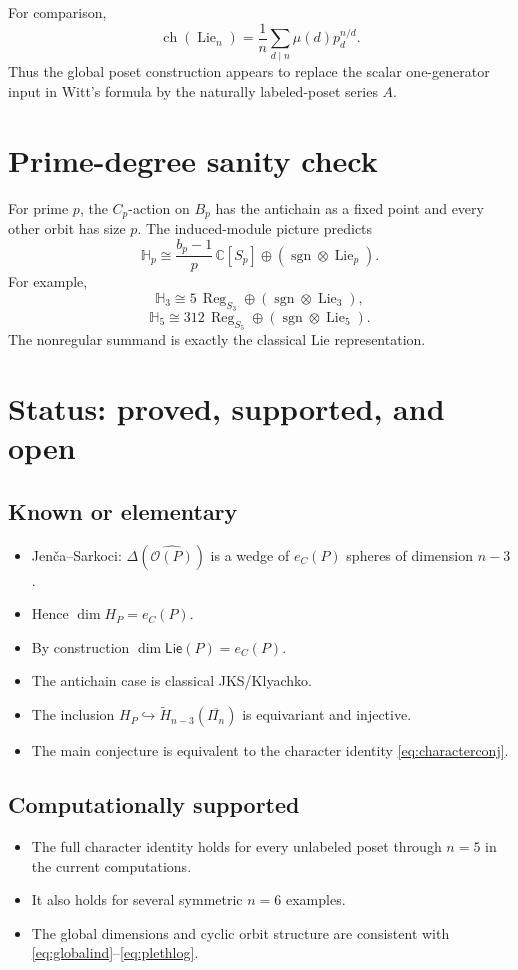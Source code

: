 \documentclass[11pt]{article}
\newcommand{\OP}{\mathcal O}
\newcommand{\Lie}{\operatorname{Lie}}
\newcommand{\sgn}{\operatorname{sgn}}
\newcommand{\ch}{\operatorname{ch}}
\newcommand{\HH}{\mathbb H}
\begin{document}
For comparison,
\[
\ch(\Lie_n)=\frac1n\sum_{d\mid n}\mu(d)p_d^{n/d}.
\]
Thus the global poset construction appears to replace the scalar one-generator
input in Witt's formula by the naturally labeled-poset series $A$.

\section{Prime-degree sanity check}
For prime $p$, the $C_p$-action on $B_p$ has the antichain as a fixed point
and every other orbit has size $p$. The induced-module picture predicts
\[
\HH_p\cong\frac{b_p-1}{p}\,\mathbb C[S_p]\oplus
(\sgn\otimes\Lie_p).
\]
For example,
\[
\HH_3\cong5\,\operatorname{Reg}_{S_3}\oplus
(\sgn\otimes\Lie_3),
\]
\[
\HH_5\cong312\,\operatorname{Reg}_{S_5}\oplus
(\sgn\otimes\Lie_5).
\]
The nonregular summand is exactly the classical Lie representation.

\section{Status: proved, supported, and open}
\subsection*{Known or elementary}
\begin{itemize}
\item Jen\v{c}a--Sarkoci: $\Delta(\widehat{\OP(P)})$ is a wedge of
$e_C(P)$ spheres of dimension $n-3$.
\item Hence $\dim H_P=e_C(P)$.
\item By construction $\dim\mathsf{Lie}(P)=e_C(P)$.
\item The antichain case is classical JKS/Klyachko.
\item The inclusion $H_P\hookrightarrow\widetilde
H_{n-3}(\overline{\Pi_n})$ is equivariant and injective.
\item The main conjecture is equivalent to the character identity
\eqref{eq:characterconj}.
\end{itemize}

\subsection*{Computationally supported}
\begin{itemize}
\item The full character identity holds for every unlabeled poset through
$n=5$ in the current computations.
\item It also holds for several symmetric $n=6$ examples.
\item The global dimensions and cyclic orbit structure are consistent with
\eqref{eq:globalind}--\eqref{eq:plethlog}.
\end{itemize}
\end{document}
